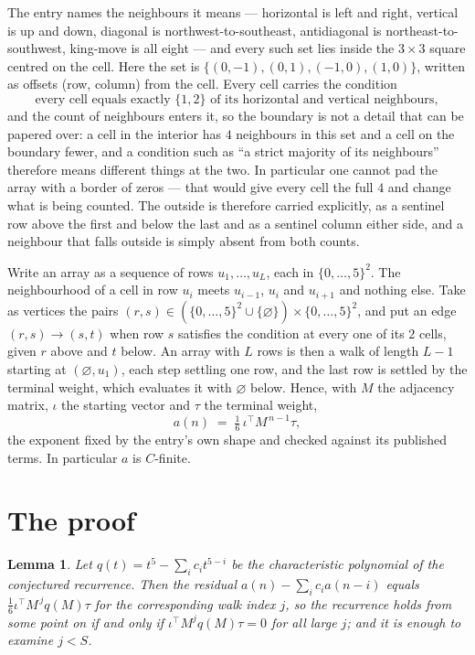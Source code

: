 \documentclass[11pt,a4paper]{article}
\theoremstyle{plain}
\newtheorem{lemma}[theorem]{Lemma}
\theoremstyle{definition}
\begin{document}
The entry names the neighbours it means --- horizontal is left and right, vertical is up and
down, diagonal is northwest-to-southeast, antidiagonal is northeast-to-southwest, king-move is
all eight --- and every such set lies inside the $3\times3$ square centred on the cell. Here
the set is $\{(0,-1), (0,1), (-1,0), (1,0)\}$, written as offsets (row, column) from the cell. Every cell carries
the condition
\[
\text{every cell equals exactly }\{1,2\}\text{ of its horizontal and vertical neighbours},
\]
and the count of neighbours enters it, so the boundary is not a detail that can be papered
over: a cell in the interior has $4$ neighbours in this set and a cell on the boundary
fewer, and a condition such as ``a strict majority of its neighbours'' therefore means
different things at the two. In particular one cannot pad the array with a border of zeros ---
that would give every cell the full $4$ and change what is being counted. The outside is
therefore carried
explicitly, as a sentinel row above the first and below the last and as a sentinel column
either side, and a neighbour that falls outside is simply absent from both counts.

Write an array as a sequence of rows $u_1,\dots,u_L$, each in
$\{0,\dots,5\}^{2}$. The neighbourhood of a cell in row $u_i$ meets $u_{i-1}$,
$u_i$ and $u_{i+1}$ and nothing else. Take as vertices the pairs
$(r,s)\in(\{0,\dots,5\}^{2}\cup\{\varnothing\})\times\{0,\dots,5\}^{2}$,
and put an edge $(r,s)\to(s,t)$ when row $s$ satisfies the condition at every one of its
$2$ cells, given $r$ above and $t$ below. An array with $L$ rows is then a walk of length
$L-1$ starting at $(\varnothing,u_1)$, each step settling one row, and the last row is
settled by the terminal weight, which evaluates it with $\varnothing$ below. Hence,
with $M$ the adjacency matrix, $\iota$ the starting vector and $\tau$ the terminal weight,
\[
a(n)\;=\;\tfrac1{6}\,\iota^{\!\top}M^{\,n-1}\tau ,
\]
the exponent fixed by the entry's own shape and checked against its published terms. In
particular $a$ is $C$-finite.

\section{The proof}

\begin{lemma}\label{lem:crit}
Let $q(t)=t^{5}-\sum_i c_it^{5-i}$ be the characteristic polynomial of the
conjectured recurrence. Then the residual $a(n)-\sum_ic_ia(n-i)$ equals
$\tfrac1{6}\iota^{\!\top}M^{\,j}q(M)\tau$ for the corresponding walk index $j$, so the
recurrence holds from some point on if and only if $\iota^{\!\top}M^{j}q(M)\tau=0$ for all
large $j$; and it is enough to examine $j<S$.
\end{lemma}
\end{document}
